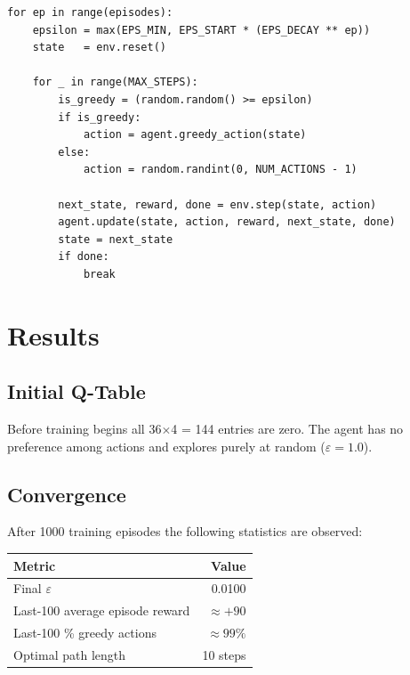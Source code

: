 \documentclass[12pt]{article}
\begin{document}
\begin{lstlisting}[caption={Per-episode training logic inside train().}]
for ep in range(episodes):
    epsilon = max(EPS_MIN, EPS_START * (EPS_DECAY ** ep))
    state   = env.reset()

    for _ in range(MAX_STEPS):
        is_greedy = (random.random() >= epsilon)
        if is_greedy:
            action = agent.greedy_action(state)
        else:
            action = random.randint(0, NUM_ACTIONS - 1)

        next_state, reward, done = env.step(state, action)
        agent.update(state, action, reward, next_state, done)
        state = next_state
        if done:
            break
\end{lstlisting}

\section{Results}

\subsection{Initial Q-Table}

Before training begins all 36$\times$4 = 144 entries are zero.
The agent has no preference among actions and explores purely at random
($\varepsilon = 1.0$).

\subsection{Convergence}

After 1000 training episodes the following statistics are observed:

\begin{center}
\begin{tabular}{@{} l r @{}}
\toprule
\textbf{Metric} & \textbf{Value} \\
\midrule
Final $\varepsilon$             & 0.0100 \\
Last-100 average episode reward & $\approx +90$ \\
Last-100 \% greedy actions      & $\approx 99\%$ \\
Optimal path length             & 10 steps \\
\bottomrule
\end{tabular}
\end{center}
\end{document}
